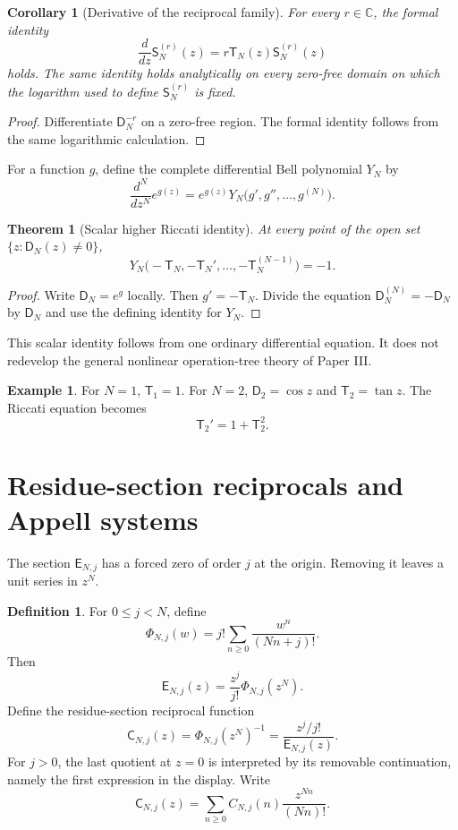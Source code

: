 \documentclass[11pt,letterpaper]{article}
\newtheorem{theorem}{Theorem}[section]
\newtheorem{corollary}[corollary]{Corollary}
\theoremstyle{definition}
\newtheorem{definition}[definition]{Definition}
\newtheorem{example}[example]{Example}
\theoremstyle{remark}
\newcommand{\CC}{\mathbb C}
\newcommand{\Dfun}{\mathsf D}
\newcommand{\Efun}{\mathsf E}
\newcommand{\Sfun}{\mathsf S}
\newcommand{\Tfun}{\mathsf T}
\newcommand{\Cfun}{\mathsf C}
\begin{document}
\begin{corollary}[Derivative of the reciprocal family]\label{cor:reciprocal_derivative}
For every $r\in\CC$, the formal identity
\[
\frac{d}{dz}\Sfun_N^{(r)}(z)
=
r\Tfun_N(z)\Sfun_N^{(r)}(z)
\]
holds.  The same identity holds analytically on every zero-free
domain on which the logarithm used to define $\Sfun_N^{(r)}$ is fixed.
\end{corollary}

\begin{proof}
Differentiate $\Dfun_N^{-r}$ on a zero-free region.  The formal identity follows from the same logarithmic calculation.
\end{proof}

For a function $g$, define the complete differential Bell polynomial $Y_N$ by
\[
\frac{d^N}{dz^N}e^{g(z)}
=
e^{g(z)}Y_N\bigl(g',g'',\ldots,g^{(N)}\bigr).
\]

\begin{theorem}[Scalar higher Riccati identity]\label{thm:higher_riccati}
At every point of the open set $\{z:\Dfun_N(z)\ne0\}$,
\[
Y_N\bigl(
-\Tfun_N,
-\Tfun_N',
\ldots,
-\Tfun_N^{(N-1)}
\bigr)
=-1.
\]
\end{theorem}

\begin{proof}
Write $\Dfun_N=e^g$ locally.  Then $g'=-\Tfun_N$.  Divide the equation $\Dfun_N^{(N)}=-\Dfun_N$ by $\Dfun_N$ and use the defining identity for $Y_N$.
\end{proof}

This scalar identity follows from one ordinary differential equation. It does
not redevelop the general nonlinear operation-tree theory of Paper III.

\begin{example}\label{ex:ordinary_tangent}
For $N=1$, $\Tfun_1=1$.  For $N=2$, $\Dfun_2=\cos z$ and $\Tfun_2=\tan z$.  The Riccati equation becomes
\[
\Tfun_2'=1+\Tfun_2^2.
\]
\end{example}

\section{Residue-section reciprocals and Appell systems}\label{sec:residue_section}

The section $\Efun_{N,j}$ has a forced zero of order $j$ at the origin.  Removing it leaves a unit series in $z^N$.

\begin{definition}\label{def:normalized_section}
For $0\leq j<N$, define
\[
\Phi_{N,j}(w)
=
j!\sum_{n\geq0}\frac{w^n}{(Nn+j)!}.
\]
Then
\[
\Efun_{N,j}(z)
=
\frac{z^j}{j!}\Phi_{N,j}(z^N).
\]
Define the residue-section reciprocal function
\[
\Cfun_{N,j}(z)
=
\Phi_{N,j}(z^N)^{-1}
=
\frac{z^j/j!}{\Efun_{N,j}(z)}.
\]
For $j>0$, the last quotient at $z=0$ is interpreted by its removable
continuation, namely the first expression in the display.
Write
\[
\Cfun_{N,j}(z)
=
\sum_{n\geq0}C_{N,j}(n)\frac{z^{Nn}}{(Nn)!}.
\]
\end{definition}
\end{document}
